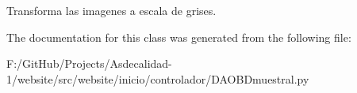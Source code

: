 \begin{DoxyVerb}Transforma las imagenes a escala de grises.
\end{DoxyVerb}
 

The documentation for this class was generated from the following file\+:\begin{DoxyCompactItemize}
\item 
F\+:/\+Git\+Hub/\+Projects/\+Asdecalidad-\/1/website/src/website/inicio/controlador/D\+A\+O\+B\+Dmuestral.\+py\end{DoxyCompactItemize}
